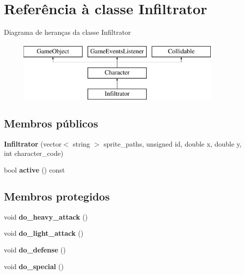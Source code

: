 \hypertarget{classInfiltrator}{}\section{Referência à classe Infiltrator}
\label{classInfiltrator}
Diagrama de heranças da classe Infiltrator\begin{figure}[H]
\begin{center}
\leavevmode
\includegraphics[height=3.000000cm]{classInfiltrator}
\end{center}
\end{figure}
\subsection*{Membros públicos}
\begin{DoxyCompactItemize}
\item 
\mbox{\label{classInfiltrator_a1eb1e0a0acf4451da046fa0e8381a1a3}} 
{\bfseries Infiltrator} (vector$<$ string $>$ sprite\+\_\+paths, unsigned id, double x, double y, int character\+\_\+code)
\item 
\mbox{\label{classInfiltrator_ae423f60190c1df91dcccb7e313845171}} 
bool {\bfseries active} () const
\end{DoxyCompactItemize}
\subsection*{Membros protegidos}
\begin{DoxyCompactItemize}
\item 
\mbox{\label{classInfiltrator_a371e7c14076375ea21304220e826e5e0}} 
void {\bfseries do\+\_\+heavy\+\_\+attack} ()
\item 
\mbox{\label{classInfiltrator_a70b8134dac23d716f86139da77cd8927}} 
void {\bfseries do\+\_\+light\+\_\+attack} ()
\item 
\mbox{\label{classInfiltrator_afc1de0dd263b72b5be1da33f6cd9bbe7}} 
void {\bfseries do\+\_\+defense} ()
\item 
\mbox{\label{classInfiltrator_ad8cbafc64c00e7e5617baccdbda80746}} 
void {\bfseries do\+\_\+special} ()
\end{DoxyCompactItemize}
